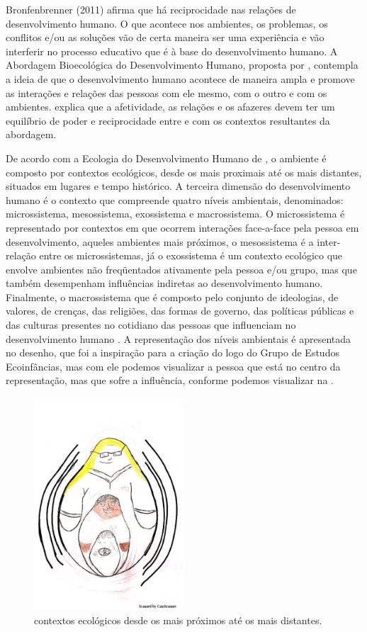 \documentclass{textolivre}
\begin{document}
Bronfenbrenner (2011) afirma que há reciprocidade nas relações de desenvolvimento humano. O que acontece nos ambientes, os problemas, os conflitos e/ou as soluções vão de certa maneira ser uma experiência e vão interferir no processo educativo que é à base do desenvolvimento humano. A Abordagem Bioecológica do Desenvolvimento Humano, proposta por \textcite{brofen2011}, contempla a ideia de que o desenvolvimento humano acontece de maneira ampla e promove as interações e relações das pessoas com ele mesmo, com o outro e com os ambientes. \textcite{brofen1996} explica que a afetividade, as relações e os afazeres devem ter um equilíbrio de poder e reciprocidade entre e com os contextos resultantes da abordagem. 

De acordo com a Ecologia do Desenvolvimento Humano de \textcite{brofen1996}, o ambiente é composto por contextos ecológicos, desde os mais proximais até os mais distantes, situados em lugares e tempo histórico. A terceira dimensão do desenvolvimento humano é o contexto que compreende quatro níveis ambientais, denominados: microssistema, mesossistema, exossistema e macrossistema. O microssistema é representado por contextos em que ocorrem interações face-a-face pela pessoa em desenvolvimento, aqueles ambientes mais próximos, o mesossistema é a inter-relação entre os microssistemas, já o exossistema é um contexto ecológico que envolve ambientes não freqüentados ativamente pela pessoa e/ou grupo, mas que também desempenham influências indiretas ao desenvolvimento humano. Finalmente, o macrossistema que é composto pelo conjunto de ideologias, de valores, de crenças, das religiões, das formas de governo, das políticas públicas e das culturas presentes no cotidiano das pessoas que influenciam no desenvolvimento humano \cite{brofen1996,piske2019}. A representação dos níveis ambientais é apresentada no desenho, que foi a inspiração para a criação do logo do Grupo de Estudos Ecoinfâncias, mas com ele podemos visualizar a pessoa que está no centro da representação, mas que sofre a influência, conforme podemos visualizar na .

\begin{figure}[h!]
 \centering
 \includegraphics[width=0.5\textwidth]{figure01.pdf}
 \caption{contextos ecológicos desde os mais próximos até os mais distantes.}
 \label{fig-fig01}
\end{figure}
\end{document}
